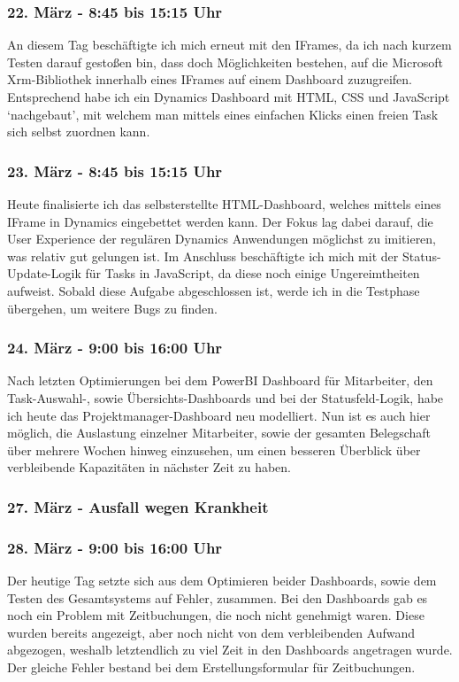 \subsubsection*{22. März - 8:45 bis 15:15 Uhr}
An diesem Tag beschäftigte ich mich erneut mit den IFrames, da ich nach kurzem Testen darauf gestoßen bin, dass doch Möglichkeiten bestehen, auf die Microsoft Xrm-Bibliothek innerhalb eines IFrames auf einem Dashboard zuzugreifen. Entsprechend habe ich ein Dynamics Dashboard mit HTML, CSS und JavaScript \enquote*{nachgebaut}, mit welchem man mittels eines einfachen Klicks einen freien Task sich selbst zuordnen kann.

\subsubsection*{23. März - 8:45 bis 15:15 Uhr} 
Heute finalisierte ich das selbsterstellte HTML-Dashboard, welches mittels eines IFrame in Dynamics eingebettet werden kann. Der Fokus lag dabei darauf, die User Experience der regulären Dynamics Anwendungen möglichst zu imitieren, was relativ gut gelungen ist. Im Anschluss beschäftigte ich mich mit der Status-Update-Logik für Tasks in JavaScript, da diese noch einige Ungereimtheiten aufweist. Sobald diese Aufgabe abgeschlossen ist, werde ich in die Testphase übergehen, um weitere Bugs zu finden.

\subsubsection*{24. März - 9:00 bis 16:00 Uhr}
Nach letzten Optimierungen bei dem PowerBI Dashboard für Mitarbeiter, den Task-Auswahl-, sowie Übersichts-Dashboards und bei der Statusfeld-Logik, habe ich heute das Projektmanager-Dashboard neu modelliert. Nun ist es auch hier möglich, die Auslastung einzelner Mitarbeiter, sowie der gesamten Belegschaft über mehrere Wochen hinweg einzusehen, um einen besseren Überblick über verbleibende Kapazitäten in nächster Zeit zu haben.

\subsubsection*{27. März - Ausfall wegen Krankheit}

\subsubsection*{28. März - 9:00 bis 16:00 Uhr}
Der heutige Tag setzte sich aus dem Optimieren beider Dashboards, sowie dem Testen des Gesamtsystems auf Fehler, zusammen. Bei den Dashboards gab es noch ein Problem mit Zeitbuchungen, die noch nicht genehmigt waren. Diese wurden bereits angezeigt, aber noch nicht von dem verbleibenden Aufwand abgezogen, weshalb letztendlich zu viel Zeit in den Dashboards angetragen wurde. Der gleiche Fehler bestand bei dem Erstellungsformular für Zeitbuchungen. 

